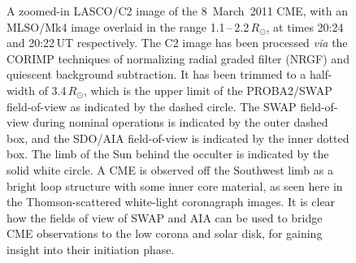 \documentclass[namedreferences]{solarphysics}
\begin{document}
\begin{article}
\begin{figure}[ht]
\caption{A zoomed-in LASCO/C2 image of the 8~March~2011 CME, with an MLSO/Mk4 image overlaid in the range 1.1\,--\,2.2\,$R_\odot$, at times 20:24 and 20:22\,UT respectively. The C2 image has been processed \emph{via} the CORIMP techniques of normalizing radial graded filter (NRGF) and quiescent background subtraction. It has been trimmed to a half-width of 3.4\,$R_\odot$, which is the upper limit of the PROBA2/SWAP field-of-view as indicated by the dashed circle. The SWAP field-of-view during nominal operations is indicated by the outer dashed box, and the SDO/AIA field-of-view is indicated by the inner dotted box. The limb of the Sun behind the occulter is indicated by the solid white circle. A CME is observed off the Southwest limb as a bright loop structure with some inner core material, as seen here in the Thomson-scattered white-light coronagraph images. It is clear how the fields of view of SWAP and AIA can be used to bridge CME observations to the low corona and solar disk, for gaining insight into their initiation phase.}
\label{overlays}
\end{figure}



\end{article}
\end{document}
